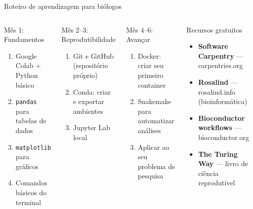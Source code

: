 \begin{frame}[shrink=15]{Roteiro de aprendizagem para biólogos}
\begin{columns}
\begin{block}{Mês 1: Fundamentos}
\begin{enumerate}
    \item Google Colab + Python básico
    \item \texttt{pandas} para tabelas de dados
    \item \texttt{matplotlib} para gráficos
    \item Comandos básicos do terminal
\end{enumerate}
\end{block}
\vspace{0.2cm}
\begin{block}{Mês 2--3: Reprodutibilidade}
\begin{enumerate}
    \item Git e GitHub (repositório próprio)
    \item Conda: criar e exportar ambientes
    \item Jupyter Lab local
\end{enumerate}
\end{block}

\begin{block}{Mês 4--6: Avançar}
\begin{enumerate}
    \item Docker: criar seu primeiro container
    \item Snakemake para automatizar análises
    \item Aplicar ao seu problema de pesquisa
\end{enumerate}
\end{block}
\vspace{0.2cm}
\begin{exampleblock}{Recursos gratuitos}
\begin{itemize}
    \item \textbf{Software Carpentry} — carpentries.org
    \item \textbf{Rosalind} — rosalind.info (bioinformática)
    \item \textbf{Bioconductor workflows} — bioconductor.org
    \item \textbf{The Turing Way} — livro de ciência reprodutível
\end{itemize}
\end{exampleblock}
\end{columns}
\end{frame}


